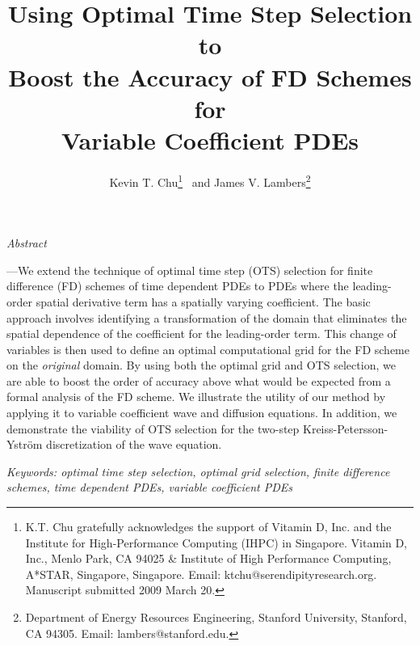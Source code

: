 \documentclass[twocolumn]{article} %
\begin{document}


\date{}

\title{\huge \bf {Using Optimal Time Step Selection to \\ 
       Boost the Accuracy of FD Schemes for \\
       Variable Coefficient PDEs }}

\author{Kevin T. Chu\thanks{
  K.T. Chu gratefully acknowledges the support of Vitamin D, Inc.
  and the Institute for High-Performance Computing (IHPC) in Singapore. 
  Vitamin D, Inc., Menlo Park, CA 94025 \& 
  Institute of High Performance Computing, A*STAR, Singapore, Singapore.
  Email: ktchu@serendipityresearch.org.
  Manuscript submitted 2009 March 20. 
 } 
 \ and
 James V. Lambers\thanks{Department of Energy Resources Engineering, 
 Stanford University, Stanford, CA 94305.  Email: lambers@stanford.edu.}
}

\maketitle
\thispagestyle{empty}

{\hspace{1pc} {\it{\small Abstract}}{\bf{\small---We extend the technique 
of optimal time step (OTS) selection for finite difference (FD) schemes of time 
dependent PDEs to PDEs where the leading-order spatial derivative term has a
spatially varying coefficient.  The basic approach involves identifying a 
transformation of the domain that eliminates the spatial dependence of the 
coefficient for the leading-order term.  This change of variables is then used 
to define an optimal computational grid for the FD scheme on the 
\emph{original} domain.   By using both the optimal grid and OTS selection, we are
able to boost the order of accuracy above what would be expected from a formal
analysis of the FD scheme.  We illustrate the utility of our method by 
applying it to variable coefficient wave and diffusion equations.  In 
addition, we demonstrate the viability of OTS selection for the two-step 
Kreiss-Petersson-Ystr\"om discretization of the wave equation.

\em Keywords: optimal time step selection, optimal grid selection, finite 
    difference schemes, time dependent PDEs, variable coefficient PDEs}}
 }
\end{document}
